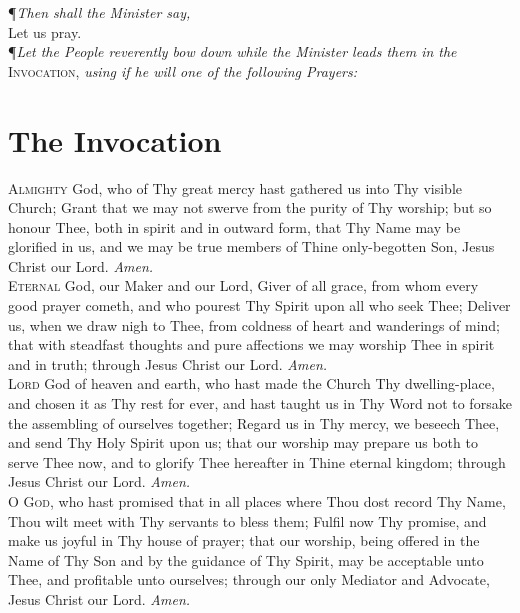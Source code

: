\begin{center}
\P \textit{Then shall the Minister say,} \\
\vspace{1ex}
Let us pray. \\
\vspace{1ex}
\P \textit{Let the People reverently bow down while the Minister leads them in the} \textsc{Invocation,} \textit{using if he will one of the following Prayers:} \\

\end{center}

\section*{The Invocation}

\lettrine{A}{lmighty} God, who of Thy great mercy hast gathered us into Thy visible Church; Grant that we may not swerve from the purity of Thy worship; but so honour Thee, both in spirit and in outward form, that Thy Name may be glorified in us, and we may be true members of Thine only-begotten Son, Jesus Christ our Lord. \textit{Amen.} \\

\noindent\lettrine{E}{ternal} God, our Maker and our Lord, Giver of all grace, from whom every good prayer cometh, and who pourest Thy Spirit upon all who seek Thee; Deliver us, when we draw nigh to Thee, from coldness of heart and wanderings of mind; that with steadfast thoughts and pure affections we may worship Thee in spirit and in truth; through Jesus Christ our Lord. \textit{Amen.} \\

\noindent\lettrine{L}{ord} God of heaven and earth, who hast made the Church Thy dwelling-place, and chosen it as Thy rest for ever, and hast taught us in Thy Word not to forsake the assembling of ourselves together; Regard us in Thy mercy, we beseech Thee, and send Thy Holy Spirit upon us; that our worship may prepare us both to serve Thee now, and to glorify Thee hereafter in Thine eternal kingdom; through Jesus Christ our Lord. \textit{Amen.} \\

\noindent\lettrine[lines=1]{O}{ God}, who hast promised that in all places where Thou dost record Thy Name, Thou wilt meet with Thy servants to bless them; Fulfil now Thy promise, and make us joyful in Thy house of prayer; that our worship, being offered in the Name of Thy Son and by the guidance of Thy Spirit, may be acceptable unto Thee, and profitable unto ourselves; through our only Mediator and Advocate, Jesus Christ our Lord. \textit{Amen.} \\

